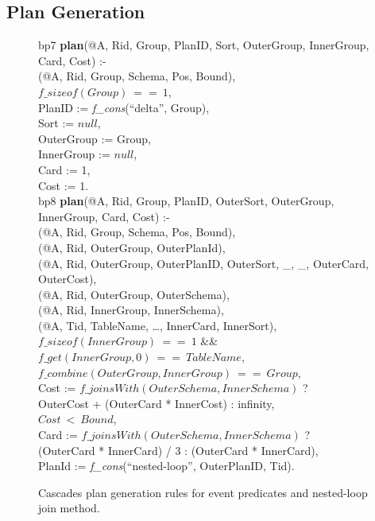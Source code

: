 \subsection{Plan Generation}
\label{ch:opt:sec:cascades_plan}

\begin{figure*}
\ssp
\centering
\begin{boxedminipage}{\linewidth}
bp7 {\bf plan}(@A, Rid, Group, PlanID, Sort, OuterGroup, InnerGroup, Card, Cost) :- \\
(@A, Rid, Group, Schema, Pos, Bound), \\
\datalogspace $f\_sizeof(Group)\ ==\ 1$, \\
\datalogspace PlanID := {\em f\_cons}(``delta'', Group), \\
\datalogspace Sort := $null$, \\
\datalogspace OuterGroup := Group, \\
\datalogspace InnerGroup := $null$, \\
\datalogspace Card := 1, \\
\datalogspace Cost := 1. \\

bp8 {\bf plan}(@A, Rid, Group, PlanID, OuterSort, OuterGroup, InnerGroup, Card, Cost) :- \\
(@A, Rid, Group, Schema, Pos, Bound), \\
(@A, Rid, OuterGroup, OuterPlanId), \\
(@A, Rid, OuterGroup, OuterPlanID, OuterSort, \_, \_, OuterCard, OuterCost), \\
(@A, Rid, OuterGroup, OuterSchema), \\

(@A, Rid, InnerGroup, InnerSchema), \\
(@A, Tid, TableName, \ldots, InnerCard, InnerSort),\\
\datalogspace $f\_sizeof(InnerGroup)\ ==\ 1$ \&\& $f\_get(InnerGroup, 0)\ ==\ TableName$, \\
\datalogspace $f\_combine(OuterGroup, InnerGroup)\ ==\ Group$, \\
\datalogspace Cost := $f\_joinsWith(OuterSchema, InnerSchema)$ ? \\
\datalogspace \datalogspace OuterCost + (OuterCard * InnerCost) : infinity, \\
\datalogspace $Cost\ <\ Bound$, \\
\datalogspace Card := $f\_joinsWith(OuterSchema, InnerSchema)$ ? \\
\datalogspace \datalogspace (OuterCard * InnerCard) / 3 : (OuterCard * InnerCard), \\
\datalogspace PlanId := {\em f\_cons}(``nested-loop'', OuterPlanID, Tid). \\

\end{boxedminipage}
\caption{\label{ch:opt:fig:cascades_plan1} Cascades plan generation rules for event
predicates and nested-loop join method.}
\end{figure*}

